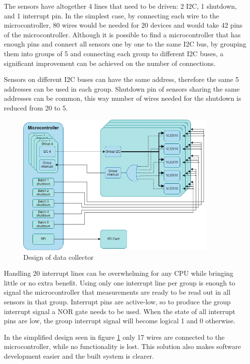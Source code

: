 The sensors have altogether 4 lines that need to be driven: 2 I2C, 1 shutdown, and 1 interrupt pin.
In the simplest case, by connecting each wire to the microcontroller, 80 wires would be needed for
20 devices and would take 42 pins of the microcontroller. Although it is possible to find a microcontroller
that has enough pins and connect all sensors one by one to the same I2C bus, by grouping them
into groups of 5 and connecting each group to different I2C buses, a significant improvement can be
achieved on the number of connections.

Sensors on different I2C buses can have the same address, therefore the same 5 addresses can be used
in each group. Shutdown pin of sensors sharing the same addresses can be common, this way number of
wires needed for the shutdown is reduced from 20 to 5.

\begin{figure}[ht]
    \centering
    \includegraphics[width=100mm, keepaspectratio]{figures/data_collector.png}
    \caption{Design of data collector}
    \label{fig:data_collector}
\end{figure}

Handling 20 interrupt lines can be overwhelming for any CPU while bringing little or no extra
benefit. Using only one interrupt line per group is enough to signal the microcontroller that
measurements are ready to be read out in all sensors in that group. Interrupt pins are active-low,
so to produce the group interrupt signal a NOR gate needs to be used. When the state of all interrupt
pins are low, the group interrupt signal will become logical 1 and 0 otherwise.

In the simplified design seen in figure \ref{fig:data_collector} only 17 wires are connected to
the microcontroller, while no functionality is lost. This solution also makes software development
easier and the built system is clearer.



